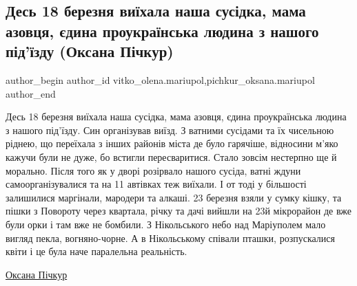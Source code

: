  
 
 
 
 

\subsection{Десь 18 березня виїхала наша сусідка, мама азовця, єдина проукраїнська людина з нашого під'їзду (Оксана Пічкур)}
\label{sec:16_03_2023.fb.vitko_olena.mariupol.2.des_18_bereznya_vi_k}
 
\ifcmt
 author_begin
   author_id vitko_olena.mariupol,pichkur_oksana.mariupol
 author_end
\fi

Десь 18 березня виїхала наша сусідка, мама азовця, єдина проукраїнська людина
з нашого під'їзду.  Син організував  виїзд. З ватними сусідами та їх чисельною
ріднею, що переїхала з інших районів міста де було гарячіше, відносини м'яко
кажучи були не дуже, бо встигли пересваритися. Стало зовсім нестерпно ще й
морально. Після того як у дворі розірвало нашого сусіда, ватні ждуни
самоорганізувалися та на 11 автівках теж виїхали. І от тоді  у більшості
залишилися маргінали, мародери та алкаші. 23 березня взяли у сумку кішку, та
пішки з Повороту через квартала, річку та дачі вийшли на 23й мікрорайон де вже
були орки і там вже не бомбили. З Нікольського небо над Маріуполем мало вигляд
пекла, вогняно-чорне. А в Нікольському співали пташки, розпускалися квіти і це
була наче паралельна реальність.

\href{https://www.facebook.com/profile.php?id=100019525890344}{Оксана Пічкур}
